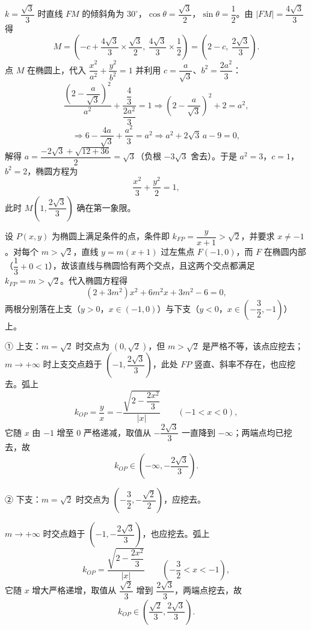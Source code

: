 \begin{answer}
\(k=\dfrac{\sqrt{3}}{3}\) 时直线 \(FM\) 的倾斜角为 \(30^{\circ}\)，\(\cos\theta=\dfrac{\sqrt{3}}{2}\)，\(\sin\theta=\dfrac{1}{2}\)。由 \(|FM|=\dfrac{4\sqrt{3}}{3}\) 得
\nopagebreak[4]
\[
M=\left(-c+\dfrac{4\sqrt{3}}{3}\times\dfrac{\sqrt{3}}{2},\ \dfrac{4\sqrt{3}}{3}\times\dfrac{1}{2}\right)=\left(2-c,\ \dfrac{2\sqrt{3}}{3}\right).
\]
点 \(M\) 在椭圆上，代入 \(\dfrac{x^{2}}{a^{2}}+\dfrac{y^{2}}{b^{2}}=1\) 并利用 \(c=\dfrac{a}{\sqrt{3}}\)、\(b^{2}=\dfrac{2a^{2}}{3}\)：
\nopagebreak[4]
\[
\dfrac{\left(2-\dfrac{a}{\sqrt{3}}\right)^{2}}{a^{2}}+\dfrac{\dfrac{4}{3}}{\dfrac{2a^{2}}{3}}=1 \Longrightarrow \left(2-\dfrac{a}{\sqrt{3}}\right)^{2}+2=a^{2},
\]
\nopagebreak[4]
\[
\Longrightarrow 6-\dfrac{4a}{\sqrt{3}}+\dfrac{a^{2}}{3}=a^{2} \Longrightarrow a^{2}+2\sqrt{3}\,a-9=0,
\]
解得 \(a=\dfrac{-2\sqrt{3}+\sqrt{12+36}}{2}=\sqrt{3}\)（负根 \(-3\sqrt{3}\) 舍去）。于是 \(a^{2}=3\)，\(c=1\)，\(b^{2}=2\)，椭圆方程为
\nopagebreak[4]
\[
\dfrac{x^{2}}{3}+\dfrac{y^{2}}{2}=1,
\]
此时 \(M\left(1,\dfrac{2\sqrt{3}}{3}\right)\) 确在第一象限。


设 \(P(x,y)\) 为椭圆上满足条件的点，条件即 \(k_{FP}=\dfrac{y}{x+1}>\sqrt{2}\)，并要求 \(x\neq-1\)。对每个 \(m>\sqrt{2}\)，直线 \(y=m(x+1)\) 过左焦点 \(F(-1,0)\)，而 \(F\) 在椭圆内部（\(\dfrac{1}{3}+0<1\)），故该直线与椭圆恰有两个交点，且这两个交点都满足 \(k_{FP}=m>\sqrt{2}\)。代入椭圆方程得
\nopagebreak[4]
\[
(2+3m^{2})x^{2}+6m^{2}x+3m^{2}-6=0,
\]
两根分别落在上支（\(y>0\)，\(x\in(-1,0)\)）与下支（\(y<0\)，\(x\in\left(-\dfrac{3}{2},-1\right)\)）上。

① 上支：\(m=\sqrt{2}\) 时交点为 \((0,\sqrt{2})\)，但 \(m>\sqrt{2}\) 是严格不等，该点应挖去；\(m\to+\infty\) 时上支交点趋于 \(\left(-1,\dfrac{2\sqrt{3}}{3}\right)\)，此处 \(FP\) 竖直、斜率不存在，也应挖去。弧上
\nopagebreak[4]
\[
k_{OP}=\dfrac{y}{x}=-\dfrac{\sqrt{2-\dfrac{2x^{2}}{3}}}{|x|}\qquad(-1<x<0),
\]
它随 \(x\) 由 \(-1\) 增至 \(0\) 严格递减，取值从 \(-\dfrac{2\sqrt{3}}{3}\) 一直降到 \(-\infty\)；两端点均已挖去，故
\nopagebreak[4]
\[
k_{OP}\in\left(-\infty,-\dfrac{2\sqrt{3}}{3}\right).
\]

② 下支：\(m=\sqrt{2}\) 时交点为 \(\left(-\dfrac{3}{2},-\dfrac{\sqrt{2}}{2}\right)\)，应挖去。

\(m\to+\infty\) 时交点趋于 \(\left(-1,-\dfrac{2\sqrt{3}}{3}\right)\)，也应挖去。弧上
\nopagebreak[4]
\[
k_{OP}=\dfrac{\sqrt{2-\dfrac{2x^{2}}{3}}}{|x|}\qquad\left(-\dfrac{3}{2}<x<-1\right),
\]
它随 \(x\) 增大严格递增，取值从 \(\dfrac{\sqrt{2}}{3}\) 增到 \(\dfrac{2\sqrt{3}}{3}\)，两端点挖去，故
\nopagebreak[4]
\[
k_{OP}\in\left(\dfrac{\sqrt{2}}{3},\dfrac{2\sqrt{3}}{3}\right).
\]


\end{answer}
